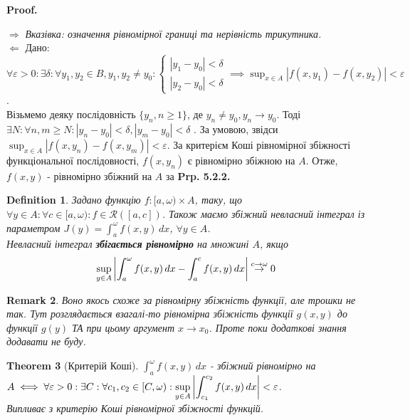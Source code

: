 \documentclass[a4paper, 10pt]{article}
\makeatletter
\def\huge{\displaystyle}
\def\qed{$\blacksquare$}
\def\rightproof{$\boxed{\Rightarrow}$ }
\def\leftproof{$\boxed{\Leftarrow}$ }
\theoremstyle{theoremdd}
\newtheorem{theorem}{Theorem}[subsection]
\theoremstyle{theoremdd}
\newtheorem{definition}[theorem]{Definition}
\theoremstyle{theoremdd}
\theoremstyle{theoremdd}
\theoremstyle{theoremdd}
\theoremstyle{theoremdd}
\newtheorem{remark}[theorem]{Remark}
\theoremstyle{theoremdd}
\theoremstyle{theoremdd}
\renewenvironment{proof}[1][Proof.\\]{\par
\pushQED{\hfill \qed}%
\normalfont \topsep6\p@\@plus6\p@\relax
\trivlist
\item\relax
{\bfseries
#1\@addpunct{.}}\hspace\labelsep\ignorespaces
}{%
\popQED\endtrivlist\@endpefalse
}
\makeatother
\begin{document}
\begin{proof}
\rightproof \textit{Вказівка: означення рівномірної границі та нерівність трикутника.}
\bigskip \\
\leftproof Дано: $\forall \varepsilon > 0: \exists \delta: \forall y_1,y_2 \in B, y_1,y_2 \neq y_0: \begin{cases} |y_1-y_0| < \delta \\ |y_2-y_0| < \delta \end{cases} \implies \huge\sup_{x \in A} |f(x,y_1)-f(x,y_2)| < \varepsilon$.\\
Візьмемо деяку послідовність $\{y_n, n \geq 1\}$, де $y_n \neq y_0, y_n \to y_0$. Тоді \\ $\exists N: \forall n,m \geq N: |y_n-y_0| < \delta, |y_m - y_0| < \delta$ . За умовою, звідси $\huge\sup_{x \in A} |f(x,y_n) - f(x,y_m)| < \varepsilon$. За критерієм Коші рівномірної збіжності функціональної послідовності, $f(x,y_n)$ є рівномірно збіжною на $A$. Отже, $f(x,y)$ - рівномірно збіжний на $A$ за \textbf{Prp. 5.2.2.}
\end{proof}

\begin{definition}
Задано функцію $f: [a,\omega) \times A$, таку, що $\forall y \in A: \forall c \in [a,\omega): f\in \mathcal{R}([a,c])$. Також маємо збіжний невласний інтеграл із параметром $J(y)= \huge \int_a^\omega f(x,y)\,dx$, $\forall y \in A$.\\
Невласний інтеграл \textbf{збігається рівномірно} на множині $A$, якщо
\begin{align*}
\huge \sup_{y \in A} \abs{\int_a^\omega f(x,y)\,dx - \int_a^c f(x,y)\,dx} \overset{c \to \omega}{\to} 0
\end{align*}
\end{definition}

\begin{remark}
Воно якось схоже за рівномірну збіжність функції, але трошки не так. Тут розглядається взагалі-то рівномірна збіжність функції $g(x,y)$ до функції $g(y)$ ТА при цьому аргумент $x \to x_0$. Проте поки додаткові знання додавати не буду.
\end{remark}

\begin{theorem}[Критерій Коші]
$\huge \int_a^\omega f(x,y)\,dx$ - збіжний рівномірно на $A \iff \forall \varepsilon > 0: \exists C: \forall c_1,c_2 \in [C,\omega): \huge \sup_{y \in A} \abs{\int_{c_1}^{c_2} f(x,y)\,dx} < \varepsilon$.\\
\textit{Випливає з критерію Коші рівномірної збіжності функцій.}
\end{theorem}
\end{document}
